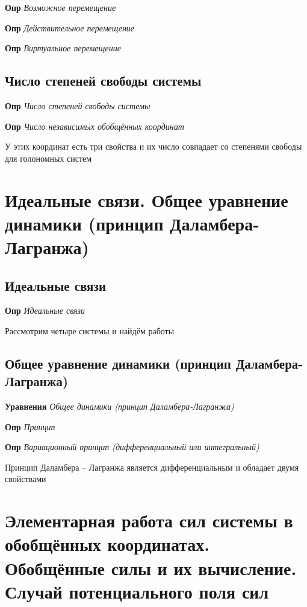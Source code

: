 \documentclass[a4paper, 14pt]{article}
\begin{document}
    \textbf{Опр} \textit{Возможное перемещение}
    
    \textbf{Опр} \textit{Действительное перемещение}
    
    \textbf{Опр} \textit{Виртуальное перемещение}
    
    \subsection{Число степеней свободы системы}
    
    \textbf{Опр} \textit{Число степеней свободы системы}
    
    \textbf{Опр} \textit{Число независимых обобщённых координат}
    
    У этих координат есть три свойства и их число совпадает со степенями свободы для голономных систем
    
    \section{Идеальные связи.
    Общее уравнение динамики (принцип Даламбера-Лагранжа)}
    
    \subsection{Идеальные связи}
    
    \textbf{Опр} \textit{Идеальные связи}
    
    Рассмотрим четыре системы и найдём работы
    
    \subsection{Общее уравнение динамики (принцип Даламбера-Лагранжа)}
    
    \textbf{Уравнения} \textit{Общее динамики (принцип Даламбера-Лагранжа)}
    
    \textbf{Опр} \textit{Принцип}
    
    \textbf{Опр} \textit{Вариационный принцип (дифференциальный или интегральный)}
    
    Принцип Даламбера -- Лагранжа является дифференциальным и обладает двумя свойствами
    
    \section{Элементарная работа сил системы в обобщённых координатах.
    Обобщённые силы и их вычисление.
    Случай потенциального поля сил}
    
\end{document}
